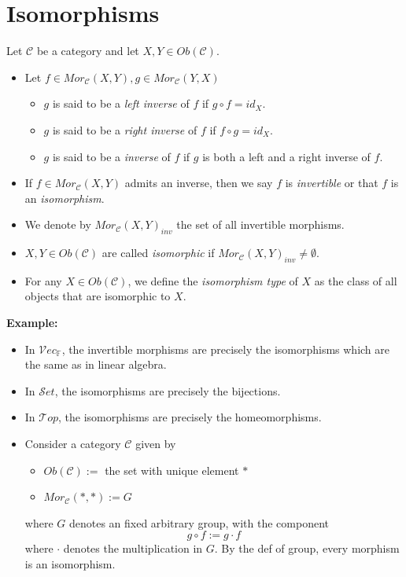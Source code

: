 \section{Isomorphisms}

\begin{definition}
    Let $\mathcal{C}$ be a category and let $X,Y \in Ob(\mathcal{C})$.

    \begin{itemize}
        \item Let $f \in Mor_\mathcal{C} (X,Y), g\in Mor_{\mathcal{C}} (Y,X)$
        \begin{itemize}
            \item $g$ is said to be a \textit{left inverse} of $f$ if $g \circ f = id_X$.
            \item $g$ is said to be a \textit{right inverse} of $f$ if $f \circ g = id_X$.
            \item $g$ is said to be a \textit{inverse} of $f$ if $g$ is both a left and a right inverse of $f$.
        \end{itemize}
        
        \item If $f \in Mor_\mathcal{C}(X,Y)$ admits an inverse, then we say $f$ is \textit{invertible} or that $f$ is an \textit{isomorphism}.
        \item We denote by $Mor_\mathcal{C}(X,Y)_{inv}$ the set of all invertible morphisms.
        \item $X,Y \in Ob(\mathcal{C})$ are called \textit{isomorphic} if $Mor_\mathcal{C}(X,Y)_{inv} \neq \emptyset$.
        \item For any $X \in Ob(\mathcal{C})$, we define the \textit{isomorphism type} of $X$ as the class of all objects that are isomorphic to $X$.
    \end{itemize}
\end{definition}

\noindent\textbf{Example:}
\begin{itemize}
    \item In $\mathcal{V}ec_\mathbb{F}$, the invertible morphisms are precisely the isomorphisms which are the same as in linear algebra.
    \item In $\mathcal{S}et$, the isomorphisms are precisely the bijections.
    \item In $\mathcal{T}op$, the isomorphisms are precisely the homeomorphisms.
    \item Consider a category $\mathcal{C}$ given by
    \begin{itemize}
        \item $Ob(\mathcal{C}) :=$ the set with unique element $*$
        \item $Mor_\mathcal{C}(*,*) := G$
    \end{itemize}
    where $G$ denotes an fixed arbitrary group, with the component
    $$g \circ f:= g \cdot f$$
    where $\cdot$ denotes the multiplication in $G$. By the def of group, every morphism is an isomorphism.
\end{itemize}

